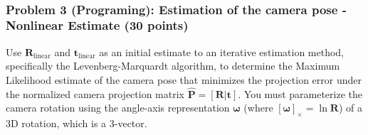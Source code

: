 \documentclass[11pt]{article}
\begin{document}
    \begin{center}
    \end{center}
    { \hspace*{\fill} \\}
    
    \subsubsection{Problem 3 (Programing): Estimation of the camera pose -
Nonlinear Estimate (30
points)}\label{problem-3-programing-estimation-of-the-camera-pose---nonlinear-estimate-30-points}

Use \(\boldsymbol{R}_\text{linear}\) and
\(\boldsymbol{t}_\text{linear}\) as an initial estimate to an iterative
estimation method, specifically the Levenberg-Marquardt algorithm, to
determine the Maximum Likelihood estimate of the camera pose that
minimizes the projection error under the normalized camera projection
matrix \(\hat{\boldsymbol{P}} =  [\boldsymbol{R} | \boldsymbol{t}]\).
You must parameterize the camera rotation using the angle-axis
representation \(\boldsymbol{\omega}\) (where
\([\boldsymbol{\omega}]_\times = \ln \boldsymbol{R}\)) of a 3D rotation,
which is a 3-vector.
\end{document}
